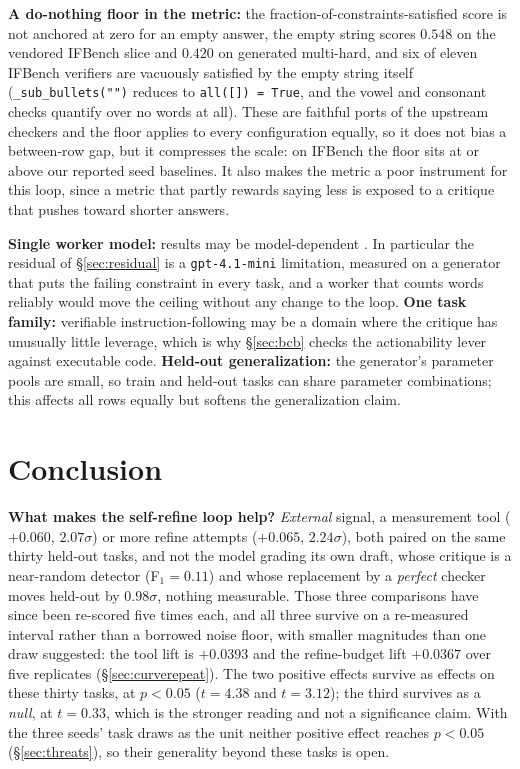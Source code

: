 \documentclass[11pt]{article}
\begin{document}
\textbf{A do-nothing floor in the
metric:} the fraction-of-constraints-satisfied score is not anchored at zero for an empty
answer, the empty string scores $0.548$ on the vendored IFBench slice \citep{pyatkin2025ifbench} and $0.420$ on
generated multi-hard, and six of eleven IFBench verifiers are vacuously satisfied by the empty
string itself (\texttt{\_sub\_bullets("")} reduces to \texttt{all([]) = True}, and the vowel and
consonant checks quantify over no words at all). These are faithful ports of the upstream checkers and the floor
applies to every configuration equally, so it does not bias a between-row gap, but it compresses the scale: on IFBench
the floor sits at or above our reported seed baselines. It also makes the metric a poor
instrument for this loop, since a metric that partly rewards saying less is exposed to a
critique that pushes toward shorter answers.

\textbf{Single worker model:} results may be model-dependent \citep{huang2023cannot}. In
particular the residual of \S\ref{sec:residual} is a \texttt{gpt-4.1-mini} limitation, measured on a
generator that puts the failing constraint in every task, and a
worker that counts words reliably would move the ceiling without any change to the loop.
\textbf{One task family:} verifiable instruction-following may be a domain where the critique
has unusually little leverage, which is why \S\ref{sec:bcb} checks the actionability lever
against executable code. \textbf{Held-out generalization:} the
generator's parameter pools are small, so train and held-out tasks can share parameter
combinations; this affects all rows equally but softens the generalization claim.

\section{Conclusion}
\label{sec:conclusion}

\textbf{What makes the self-refine loop help?} \emph{External} signal, a measurement tool
($+0.060$, $2.07\sigma$) or more refine attempts ($+0.065$, $2.24\sigma$), both paired on the same
thirty held-out tasks, and not the model grading its own draft, whose critique is a
near-random detector (F$_1\!=\!0.11$) and whose replacement by a \emph{perfect} checker
moves held-out by $0.98\sigma$, nothing measurable. Those three comparisons have since been
re-scored five times each, and all three survive on a re-measured interval rather than a
borrowed noise floor, with smaller magnitudes than one draw suggested: the tool lift is
$+0.0393$ and the refine-budget lift $+0.0367$ over five replicates
(\S\ref{sec:curverepeat}). The two positive effects survive as effects on these thirty tasks,
at $p<0.05$ ($t = 4.38$ and $t = 3.12$); the third survives as a \emph{null}, at $t = 0.33$, which
is the stronger reading and not a significance claim. With the three seeds' task draws as the unit
neither positive effect reaches $p<0.05$ (\S\ref{sec:threats}), so their generality beyond these
tasks is open.
\end{document}
